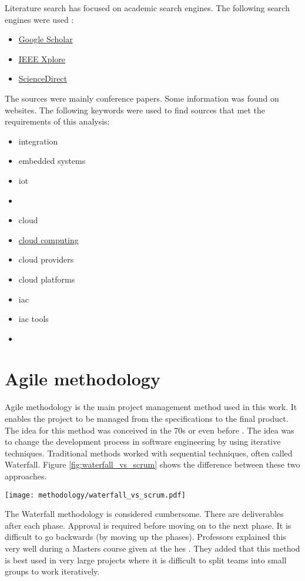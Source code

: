 Literature search has focused on academic search engines. The following search engines were used :
\begin{itemize}
    \item \href{https://scholar.google.com}{Google Scholar}
    \item \href{https://ieeexplore.ieee.org/Xplore/home.jsp}{IEEE Xplore}
    \item \href{https://www.sciencedirect.com}{ScienceDirect}
\end{itemize}
The sources were mainly conference papers. Some information was found on websites. The following keywords were used to find sources that met the requirements of this analysis:
\begin{itemize}
    \item integration
    \item embedded systems
    \item \acrshort{iot}
    \item {}
    \item \gls{cloud}
    \item \hyperref[subsec:cloudcomputing]{cloud computing}
    \item \gls{cloud} providers
    \item \gls{cloud} platforms
    \item \acrlong{iac}
    \item \acrshort{iac} tools
    \item {}
\end{itemize}


\section{Agile methodology}

Agile methodology is the main project management method used in this work. It enables the project to be managed from the specifications to the final product. The idea for this method was conceived in the 70s or even before \cite{abbas_historical_2008}.  The idea was to change the development process in software engineering by using iterative techniques. Traditional methods worked with sequential techniques, often called Waterfall. Figure \ref{fig:waterfall_vs_scrum} shows the difference between these two approaches.
\begin{center}
    \begingroup
    \texttt{[image: methodology/waterfall\_vs\_scrum.pdf]}
    \label{fig:waterfall_vs_scrum}
    \endgroup
\end{center}
The Waterfall methodology is considered cumbersome. There are deliverables after each phase. Approval is required before moving on to the next phase. It is difficult to go backwards (by moving up the phases). Professors explained this very well during a Masters course given at the \gls{hes} \cite{course_MA_ITProMan}. They added that this method is best used in very large projects where it is difficult to split teams into small groups to work iteratively.

